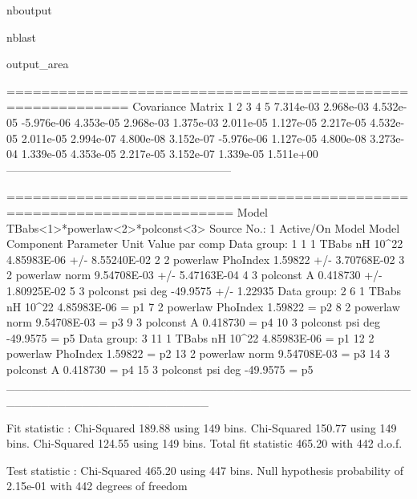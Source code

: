 \documentclass[letterpaper,10pt,english]{sphinxmanual}
\begin{document}
\begin{sphinxuseclass}{nboutput}
\begin{sphinxuseclass}{nblast}
{\begin{sphinxuseclass}{output_area}
\begin{sphinxuseclass}{}
\begin{sphinxVerbatim}[commandchars=\\\{\}]
============================================================
  Covariance Matrix
        1           2           3           4           5
   7.314e-03   2.968e-03   4.532e-05  -5.976e-06   4.353e-05
   2.968e-03   1.375e-03   2.011e-05   1.127e-05   2.217e-05
   4.532e-05   2.011e-05   2.994e-07   4.800e-08   3.152e-07
  -5.976e-06   1.127e-05   4.800e-08   3.273e-04   1.339e-05
   4.353e-05   2.217e-05   3.152e-07   1.339e-05   1.511e+00
------------------------------------------------------------

========================================================================
Model TBabs<1>*powerlaw<2>*polconst<3> Source No.: 1   Active/On
Model Model Component  Parameter  Unit     Value
 par  comp
                           Data group: 1
   1    1   TBabs      nH         10\^{}22    4.85983E-06  +/-  8.55240E-02
   2    2   powerlaw   PhoIndex            1.59822      +/-  3.70768E-02
   3    2   powerlaw   norm                9.54708E-03  +/-  5.47163E-04
   4    3   polconst   A                   0.418730     +/-  1.80925E-02
   5    3   polconst   psi        deg      -49.9575     +/-  1.22935
                           Data group: 2
   6    1   TBabs      nH         10\^{}22    4.85983E-06  = p1
   7    2   powerlaw   PhoIndex            1.59822      = p2
   8    2   powerlaw   norm                9.54708E-03  = p3
   9    3   polconst   A                   0.418730     = p4
  10    3   polconst   psi        deg      -49.9575     = p5
                           Data group: 3
  11    1   TBabs      nH         10\^{}22    4.85983E-06  = p1
  12    2   powerlaw   PhoIndex            1.59822      = p2
  13    2   powerlaw   norm                9.54708E-03  = p3
  14    3   polconst   A                   0.418730     = p4
  15    3   polconst   psi        deg      -49.9575     = p5
\_\_\_\_\_\_\_\_\_\_\_\_\_\_\_\_\_\_\_\_\_\_\_\_\_\_\_\_\_\_\_\_\_\_\_\_\_\_\_\_\_\_\_\_\_\_\_\_\_\_\_\_\_\_\_\_\_\_\_\_\_\_\_\_\_\_\_\_\_\_\_\_


Fit statistic  : Chi-Squared                  189.88     using 149 bins.
                 Chi-Squared                  150.77     using 149 bins.
                 Chi-Squared                  124.55     using 149 bins.
Total fit statistic                           465.20     with 442 d.o.f.

Test statistic : Chi-Squared                  465.20     using 447 bins.
 Null hypothesis probability of 2.15e-01 with 442 degrees of freedom
\end{sphinxVerbatim}



\end{sphinxuseclass}
\end{sphinxuseclass}
}

\end{sphinxuseclass}
\end{sphinxuseclass}
\end{document}
